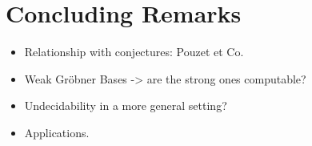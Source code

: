 \section{Concluding Remarks}
\label{sec:conclusion}

\begin{itemize}
    \item Relationship with conjectures: Pouzet et Co.
    \item Weak Gröbner Bases -> are the strong ones computable?
    \item Undecidability in a more general setting?
    \item Applications.
\end{itemize}
